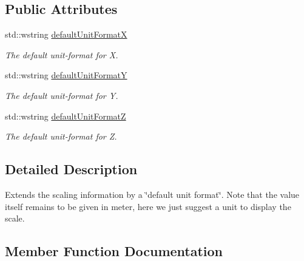 \subsection*{Public Attributes}
\begin{DoxyCompactItemize}
\item 
\mbox{\label{structlib_c_z_i_1_1_scaling_info_ex_acdcace3931188bb0b5514f859d068284}} 
std\+::wstring \hyperlink{structlib_c_z_i_1_1_scaling_info_ex_acdcace3931188bb0b5514f859d068284}{default\+Unit\+FormatX}
\begin{DoxyCompactList}\small\item\em The default unit-\/format for X. \end{DoxyCompactList}\item 
\mbox{\label{structlib_c_z_i_1_1_scaling_info_ex_a508a52d4f82bcbcf77697eaf12cbb255}} 
std\+::wstring \hyperlink{structlib_c_z_i_1_1_scaling_info_ex_a508a52d4f82bcbcf77697eaf12cbb255}{default\+Unit\+FormatY}
\begin{DoxyCompactList}\small\item\em The default unit-\/format for Y. \end{DoxyCompactList}\item 
\mbox{\label{structlib_c_z_i_1_1_scaling_info_ex_aeb63a3f3cd94309efe6de8852f113d5c}} 
std\+::wstring \hyperlink{structlib_c_z_i_1_1_scaling_info_ex_aeb63a3f3cd94309efe6de8852f113d5c}{default\+Unit\+FormatZ}
\begin{DoxyCompactList}\small\item\em The default unit-\/format for Z. \end{DoxyCompactList}\end{DoxyCompactItemize}


\subsection{Detailed Description}
Extends the scaling information by a \char`\"{}default unit format\char`\"{}. Note that the value itself remains to be given in meter, here we just suggest a unit to display the scale. 

\subsection{Member Function Documentation}
\mbox{\label{structlib_c_z_i_1_1_scaling_info_ex_a65dda3ab892e628177790061a43a80e9}} 
